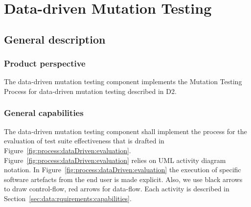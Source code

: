 


\chapter{Data-driven Mutation Testing}
\label{chapter:dataDriven}

\section{General description}




\subsection{Product perspective}
\RQ{} The data-driven mutation testing component implements the Mutation Testing Process for data-driven mutation testing described in D2.
\clearpage
\subsection{General capabilities}

\RQ{} The data-driven mutation testing component shall implement the process for the evaluation of test suite effectiveness that is drafted in Figure~\ref{fig:process:dataDriven:evaluation}. Figure~\ref{fig:process:dataDriven:evaluation} relies on UML activity diagram notation. In Figure~\ref{fig:process:dataDriven:evaluation} the execution of specific software artefacts from the end user is made explicit. Also, we use black arrows to draw control-flow, red arrows for data-flow. Each activity is described in Section~\ref{sec:data:rquirements:capabilities}.

